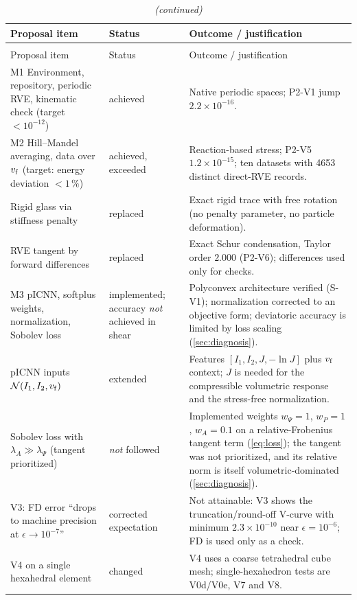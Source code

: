 {\small
\begin{xltabular}{\textwidth}{@{}p{3.6cm}p{2.3cm}X@{}}
\caption{Milestones of the proposal and their outcome.}\label{tab:proposal}\\
\toprule
Proposal item & Status & Outcome / justification\\
\midrule
\endfirsthead
\caption[]{\emph{(continued)}}\\
\toprule
Proposal item & Status & Outcome / justification\\
\midrule
\endhead
\bottomrule
\endfoot
M1 Environment, repository, periodic RVE, kinematic check (target $<10^{-12}$) &
  achieved & Native periodic spaces; P2-V1 jump $2.2\times10^{-16}$.\\
M2 Hill--Mandel averaging, data over $v_{\mathrm f}$ (target: energy deviation $<1\,\%$) &
  achieved, exceeded & Reaction-based stress; P2-V5 $1.2\times10^{-15}$; ten datasets with 4653 distinct direct-RVE records.\\
Rigid glass via stiffness penalty & replaced & Exact rigid trace with free rotation (no penalty parameter, no particle deformation).\\
RVE tangent by forward differences & replaced & Exact Schur condensation, Taylor order $2.000$ (P2-V6); differences used only for checks.\\
M3 pICNN, softplus weights, normalization, Sobolev loss & implemented; accuracy \emph{not} achieved in shear &
  Polyconvex architecture verified (S-V1); normalization corrected to an objective form; deviatoric accuracy is limited by loss scaling (\cref{sec:diagnosis}).\\
pICNN inputs $\mathcal N(I_1,I_2,v_{\mathrm f})$ & extended & Features $[I_1,I_2,J,-\ln J]$ plus $v_{\mathrm f}$ context; $J$ is needed for the compressible volumetric response and the stress-free normalization.\\
Sobolev loss with $\lambda_A\gg\lambda_\Psi$ (tangent prioritized) & \emph{not} followed &
  Implemented weights $w_\Psi=1$, $w_P=1$, $w_A=0.1$ on a relative-Frobenius tangent term (\cref{eq:loss}); the tangent was not prioritized, and its relative norm is itself volumetric-dominated (\cref{sec:diagnosis}).\\
V3: FD error ``drops to machine precision at $\epsilon\to10^{-7}$'' & corrected expectation &
  Not attainable: V3 shows the truncation/round-off V-curve with minimum $2.3\times10^{-10}$ near $\epsilon=10^{-6}$; FD is used only as a check.\\
V4 on a single hexahedral element & changed &
  V4 uses a coarse tetrahedral cube mesh; single-hexahedron tests are V0d/V0e, V7 and V8.\\

\end{xltabular}}
